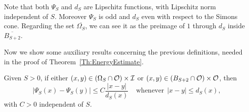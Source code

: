 Note that both $\Psi_S$ and $d_S$ are Lipschitz functions, with Lipschitz norm independent of $S$. Moreover $\Psi_S$ is odd and $d_S$ even with respect to the Simons cone. Regarding the set $\overline{\Omega_S}$, we can see it as the preimage of $1$ through $d_S$ inside $\overline{B_{S+2}}$.

Now we show some auxiliary results concerning the previous definitions, needed in the proof of Theorem~\ref{Th:EnergyEstimate}.

\begin{lemma}
\label{Lemma: AdaptedLipschitzConditionWith_dFunction}
Given $S>0$, if either $(x,y) \in \left(\Omega_S\cap \mathcal{O}\right) \times \mathcal{I}$ or $(x,y)\in \left(B_{S+2}\cap \mathcal{O}\right) \times \mathcal{O}$, then
$$ |\Psi_S(x) - \Psi_S(y)| \leq C \frac{|x-y|}{d_S(x)} \ \ \ \ \ \textrm{whenever} \ \ |x-y|\leq d_S(x), $$
with $C>0$ independent of $S$.
\end{lemma}

